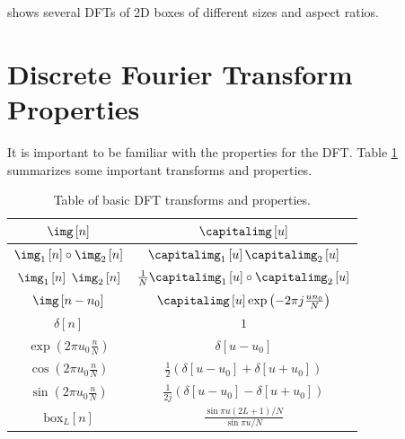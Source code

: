 \Fig{\ref{fig:2ddftexamples}} shows several DFTs of 2D boxes of different sizes and aspect ratios.

\section{Discrete Fourier Transform Properties}
\label{section:DFTproperties}

It is important to be familiar with the properties for the DFT. Table \ref{table:tableDFT} summarizes some important transforms and properties. 




\begin{table}[t]
\caption{Table of basic DFT transforms and properties.} %
\begin{center}
\begin{tabular}{| c | c |}
\hline
\bf $\img \left[ n \right]$ & \bf $\capitalimg \left[u \right]$ \\
\hline \hline
$\img_1 \left[ n \right] \circ \img_2 \left[ n \right]$& $\capitalimg_1 \left[u \right] \capitalimg_2 \left[u \right]$ \\
\hline
$\img_1 \left[ n \right]$ $\img_2 \left[ n \right]$& $\frac{1}{N} \capitalimg_1 \left[u \right] \circ \capitalimg_2 \left[u \right]$ \\
\hline
$\img \left[ n-n_0 \right]$ & $\capitalimg \left[u \right] \exp{ \left( - 2 \pi j \frac{u n_0}{N} \right) }$  \\
\hline
$\delta \left[ n \right]$ & $1$ \\
\hline
$\exp{ \left( 2 \pi u_0 \frac{n}{N} \right) }$ &
$\delta \left[u-u_0 \right]$ \\
\hline
$\cos{ \left( 2 \pi u_0 \frac{n}{N} \right) }$ &
$\frac{1}{2} \left( \delta \left[u-u_0 \right] +  \delta \left[u+u_0\right] \right)$ \\
\hline
$\sin{ \left( 2 \pi u_0 \frac{n}{N} \right) }$ &
$\frac{1}{2j} \left( \delta \left[u-u_0 \right] -  \delta \left[u+u_0\right] \right)$ \\
\hline
$\text{box}_{L} \left[n \right]$ & $\frac{\sin \pi u (2L+1)/N}{\sin \pi u/N}$ \\
\hline
\end{tabular}
\end{center}
\label{table:tableDFT}
\end{table}

